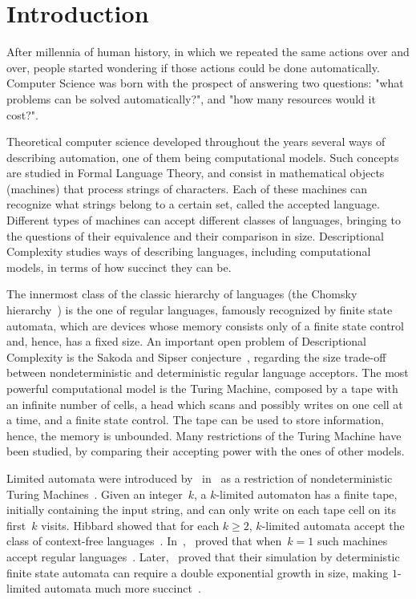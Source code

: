 \chapter{Introduction}
After millennia of human history, in which we repeated the same actions over and over, people started wondering if those actions could be done automatically.
Computer Science was born with the prospect of answering two questions: "what problems can be solved automatically?", and "how many resources would it cost?".

Theoretical computer science developed throughout the years several ways of describing automation, one of them being computational models.
Such concepts are studied in Formal Language Theory, and consist in mathematical objects (machines) that process strings of characters.
Each of these machines can recognize what strings belong to a certain set, called the accepted language.
Different types of machines can accept different classes of languages, bringing to the questions of their equivalence and their comparison in size.
Descriptional Complexity studies ways of describing languages, including computational models, in terms of how succinct they can be.

The innermost class of the classic hierarchy of languages (the Chomsky hierarchy~\cite{Cho56}) is the one of regular languages, famously recognized by finite state automata, which are devices whose memory consists only of a finite state control and, hence, has a fixed size.
An important open problem of Descriptional Complexity is the Sakoda and Sipser conjecture~\cite{SakSip78}, regarding the size trade-off between nondeterministic and deterministic regular language acceptors.
The most powerful computational model is the Turing Machine, composed by a tape with an infinite number of cells, a head which scans and possibly writes on one cell at a time, and a finite state control. The tape can be used to store information, hence, the memory is unbounded.
Many restrictions of the Turing Machine have been studied, by comparing their accepting power with the ones of other models.

Limited automata were introduced by~\citeauthor{Hib67} in~\citeyear{Hib67} as a restriction of nondeterministic Turing Machines~\cite{Hib67}.
Given an integer~$k$, a $k$-limited automaton has a finite tape, initially containing the input string, and can only write on each tape cell on its first~$k$ visits.
Hibbard showed that for each $k\ge2$, $k$-limited automata accept the class of context-free languages~\cite{Hib67}.
In~\citeyear{WagWec86},~\citeauthor{WagWec86} proved that when~$k=1$ such machines accept regular languages~\cite{WagWec86}.
Later,~\citeauthor{PigPis14} proved that their simulation by deterministic finite state automata can require a double exponential growth in size, making $1$-limited automata much more succinct~\cite{PigPis14}.

